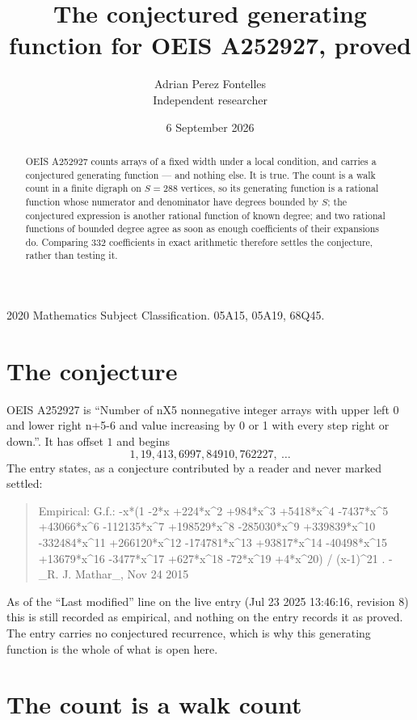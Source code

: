\documentclass[11pt,a4paper]{article}
\title{The conjectured generating function for OEIS A252927, proved}
\author{Adrian Perez Fontelles\\ \small Independent researcher}
\date{6 September 2026}
\theoremstyle{plain}
\theoremstyle{definition}
\begin{document}
\maketitle

\begin{abstract}
OEIS A252927 counts arrays of a fixed width under a local condition, and carries a conjectured
generating function --- and nothing else. It is true. The count is a walk count in a finite
digraph on $S=288$ vertices, so its generating function is a rational function whose numerator
and denominator have degrees bounded by $S$; the conjectured expression is another rational
function of known degree; and two rational functions of bounded degree agree as soon as enough
coefficients of their expansions do. Comparing $332$ coefficients in exact arithmetic
therefore settles the conjecture, rather than testing it.
\end{abstract}

\noindent\small 2020 Mathematics Subject Classification. 05A15, 05A19, 68Q45.\normalsize

\section{The conjecture}

OEIS A252927 is ``Number of nX5 nonnegative integer arrays with upper left 0 and lower right n+5-6 and value increasing by 0 or 1 with every step right or down.''. It has offset $1$ and begins
\[
1, 19, 413, 6997, 84910, 762227,\ \dots
\]
The entry states, as a conjecture contributed by a reader and never marked settled:
\begin{quote}
Empirical: G.f.: -x*(1 -2*x +224*x\^{}2 +984*x\^{}3 +5418*x\^{}4 -7437*x\^{}5 +43066*x\^{}6 -112135*x\^{}7 +198529*x\^{}8 -285030*x\^{}9 +339839*x\^{}10 -332484*x\^{}11 +266120*x\^{}12 -174781*x\^{}13 +93817*x\^{}14 -40498*x\^{}15 +13679*x\^{}16 -3477*x\^{}17 +627*x\^{}18 -72*x\^{}19 +4*x\^{}20) / (x-1)\^{}21 . - \_R. J. Mathar\_, Nov 24 2015
\end{quote}
As of the ``Last modified'' line on the live entry (Jul 23 2025 13:46:16, revision 8) this is still
recorded as empirical, and nothing on the entry records it as proved. The entry carries no
conjectured recurrence, which is why this generating function is the whole of what is open
here.

\section{The count is a walk count}
\end{document}
